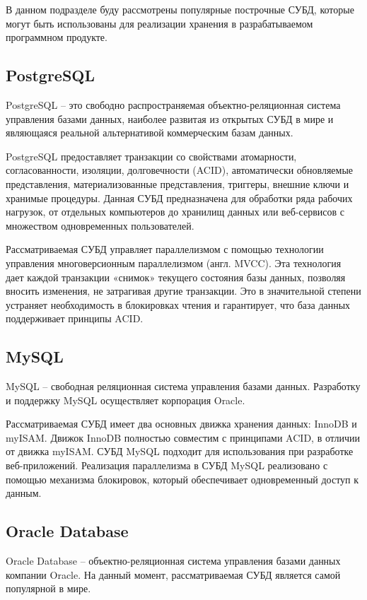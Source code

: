 	В данном подразделе буду рассмотрены популярные построчные СУБД, которые могут быть использованы для реализации хранения в разрабатываемом программном продукте.
	

\subsection*{PostgreSQL}

PostgreSQL \cite{postgresql} – это свободно распространяемая объектно-реляционная система управления базами данных, наиболее развитая из открытых СУБД в мире и являющаяся реальной альтернативой коммерческим базам данных.

PostgreSQL предоставляет транзакции со свойствами атомарности, согласованности, изоляции, долговечности (ACID), автоматически обновляемые представления, материализованные представления, триггеры, внешние ключи и хранимые процедуры. Данная СУБД предназначена для обработки ряда рабочих нагрузок, от отдельных компьютеров до хранилищ данных или веб-сервисов с множеством одновременных пользователей.

Рассматриваемая СУБД управляет параллелизмом с помощью технологии управления многоверсионным параллелизмом (англ. MVCC). Эта технология дает каждой транзакции «снимок» текущего состояния базы данных, позволяя вносить изменения, не затрагивая другие транзакции. Это в значительной степени устраняет необходимость в блокировках чтения и гарантирует, что база данных поддерживает принципы ACID.

\subsection*{MySQL}
MySQL \cite{mysql} – свободная реляционная система управления базами данных. Разработку и поддержку MySQL осуществляет корпорация Oracle.

Рассматриваемая СУБД имеет два основных движка хранения данных: InnoDB и myISAM. Движок InnoDB полностью совместим с принципами ACID, в отличии от движка myISAM. СУБД MySQL подходит для использования при разработке веб-приложений.
Реализация параллелизма в СУБД MySQL реализовано с помощью механизма блокировок, который обеспечивает одновременный доступ к данным.


\subsection*{Oracle Database}
Oracle Database \cite{oracle} – объектно-реляционная система управления базами данных компании Oracle. На данный момент, рассматриваемая СУБД является самой популярной в мире.

